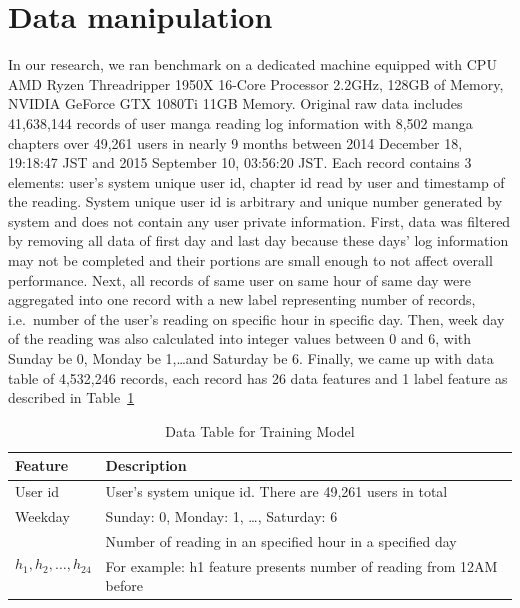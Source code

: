 \documentclass[English]{dicomopapers}
\begin{document}
\section{Data manipulation}
In our research, we ran benchmark on a dedicated machine equipped with CPU AMD Ryzen Threadripper 1950X 16-Core Processor 2.2GHz, 128GB of Memory, NVIDIA GeForce GTX 1080Ti 11GB Memory\@. Original raw data includes 41,638,144 records of user manga reading log information with 8,502 manga chapters over 49,261 users in nearly 9 months between 2014 December 18, 19:18:47 JST and 2015 September 10, 03:56:20 JST\@. Each record contains 3 elements: user's system unique user id, chapter id read by user and timestamp of the reading. System unique user id is arbitrary and unique number generated by system and does not contain any user private information.\newline
First, data was filtered by removing all data of first day and last day because these days' log information may not be completed and their portions are small enough to not affect overall performance. Next, all records of same user on same hour of same day were aggregated into one record with a new label representing number of records, i.e.\ number of the user's reading on specific hour in specific day. Then, week day of the reading was also calculated into integer values between 0 and 6, with Sunday be 0, Monday be 1,\ldots and Saturday be 6. Finally, we came up with data table of 4,532,246 records, each record has 26 data features and 1 label feature as described in Table~\ref{table:db_description}\newline
\begin{center}
  \begin{table}
    \caption{Data Table for Training Model}\label{table:db_description}
    \begin{tabular}{|p{}|p{}|}
      \toprule
      \textbf{Feature} & \textbf{Description} \\
      \midrule
      {User id} & {User's system unique id. There are 49,261 users in total} \\
      \midrule
      {Weekday} & {Sunday: 0, Monday: 1, \ldots, Saturday: 6} \\
      \midrule
      \multirow{2}{*}{\(h_1, h_2, \ldots, h_{24}\)} & {Number of reading in an specified hour in a specified day} \\
      & {For example: h1 feature presents number of reading from 12AM before}\\
      \bottomrule
    \end{tabular}
    \newline
  \end{table}
\end{center}
\end{document}
